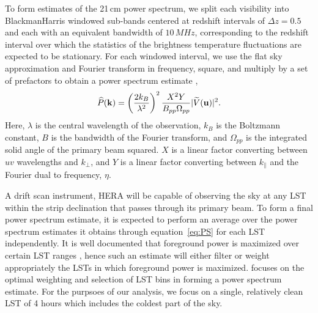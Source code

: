 \documentclass[twocolumn]{emulateapj}
\begin{document}
To form estimates of the 21\,cm power spectrum, we split each visibility into BlackmanHarris windowed sub-bands centered at redshift intervals of $\Delta z = 0.5$ and each with an equivalent bandwidth of $10\,MHz$, corresponding to the redshift interval over which the statistics of the brightness temperature fluctuations are expected to be stationary. For each windowed interval, we use the flat sky approximation and  Fourier transform in frequency, square, and multiply by a set of prefactors to obtain a power spectrum estimate \citep{Parsons:2014},
\begin{equation}\label{eq:PS}
\widehat{P}({\bf k}) = \left( \frac{2 k_B}{\lambda^2} \right)^2 \frac{X^2 Y}{B_{pp} \Omega_{pp}} | \widetilde{V}({\bf u}) |^2.
\end{equation}
Here, $\lambda$ is the central wavelength of the observation, $k_B$ is the Boltzmann constant, $B$ is the bandwidth of the Fourier transform, and $\Omega_{pp}$ is the integrated solid angle of the primary beam squared. $X$ is a linear factor converting between $uv$ wavelengths and $k_\perp$, and $Y$ is a linear factor converting between $k_\parallel$ and the Fourier dual to frequency, $\eta$. 

A drift scan instrument, HERA will be capable of observing the sky at any LST within the strip declination that passes through its primary beam. To form a final power spectrum estimate, it is expected to perform an average over the power spectrum estimates it obtains through equation~\ref{eq:PS} for each LST independently. It is well documented that foreground power is maximized over certain LST ranges \citep{Thyagarajan:2015a}, hence such an estimate will either filter or weight appropriately the LSTs in which foreground power is maximized. \citet{Thyagarajan:2016} focuses on the optimal weighting and selection of LST bins in forming a power spectrum estimate. For the purpsoes of our analysis, we focus on a single, relatively clean LST of 4 hours which includes the coldest part of the sky. 
\end{document}
